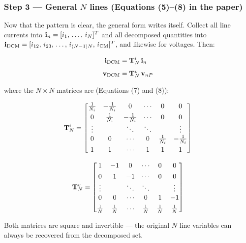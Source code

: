 \subsubsection*{Step 3 — General $N$ lines (Equations (5)--(8) in the paper)}

Now that the pattern is clear, the general form writes itself.
Collect all line currents into
$\mathbf{i}_{n} = [i_1,\,\ldots,\,i_N]^T$ and all decomposed quantities into
$\mathbf{i}_{\mathrm{DCM}} = [i_{12},\,i_{23},\,\ldots,\,i_{(N-1)N},\,i_{\mathrm{CM}}]^T$,
and likewise for voltages.  Then:

\begin{eqnbox}
\begin{align}
    \mathbf{i}_{\mathrm{DCM}} &= \mathbf{T}^{i}_{N}\, \mathbf{i}_{n}  \label{eq:Ti} \\[4pt]
    \mathbf{v}_{\mathrm{DCM}} &= \mathbf{T}^{v}_{N}\, \mathbf{v}_{nP}  \label{eq:Tv}
\end{align}
\end{eqnbox}

where the $N \times N$ matrices are (Equations (7) and (8)):

\begin{equation}
\label{eq:TiN}
\mathbf{T}^{i}_{N} =
\begin{bmatrix}
\frac{1}{N_{i}} & -\frac{1}{N_{i}} & 0 & \cdots & 0 & 0 \\[4pt]
0 & \frac{1}{N_{i}} & -\frac{1}{N_{i}} & \cdots & 0 & 0 \\
\vdots & & \ddots & \ddots & & \vdots \\
0 & 0 & \cdots & 0 & \frac{1}{N_{i}} & -\frac{1}{N_{i}} \\[4pt]
1 & 1 & \cdots & 1 & 1 & 1
\end{bmatrix}
\end{equation}

\begin{equation}
\label{eq:TvN}
\mathbf{T}^{v}_{N} =
\begin{bmatrix}
1 & -1 & 0 & \cdots & 0 & 0 \\[4pt]
0 & 1 & -1 & \cdots & 0 & 0 \\
\vdots & & \ddots & \ddots & & \vdots \\
0 & 0 & \cdots & 0 & 1 & -1 \\[4pt]
\frac{1}{N} & \frac{1}{N} & \cdots & \frac{1}{N} & \frac{1}{N} & \frac{1}{N}
\end{bmatrix}
\end{equation}

Both matrices are square and invertible — the original $N$ line
variables can always be recovered from the decomposed set.


